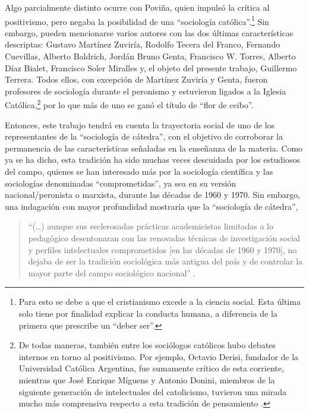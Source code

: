 Algo parcialmente distinto ocurre con Poviña, quien impulsó la crítica al positivismo, pero negaba la posibilidad de una \enquote{sociología católica}.\footnote{Para \textcite{1532-POVINA1955} esto se debe a que el cristianismo excede a la ciencia social. Esta última solo tiene por finalidad explicar la conducta humana, a diferencia de la primera que prescribe un \enquote{deber ser}.} Sin embargo, pueden mencionarse varios autores con las dos últimas características descriptas: Gustavo Martínez Zuviría, Rodolfo Tecera del Franco, Fernando Cuevillas, Alberto Baldrich, Jordán Bruno Genta, Francisco W. Torres, Alberto Díaz Bialet, Francisco Soler Miralles y, el objeto del presente trabajo, Guillermo Terrera. Todos ellos, con excepción de Martínez Zuviría y Genta, fueron profesores de sociología durante el peronismo y estuvieron ligados a la Iglesia Católica,\footnote{De todas maneras, también entre los sociólogos católicos hubo debates internos en torno al positivismo. Por ejemplo, Octavio Derisi, fundador de la Universidad Católica Argentina, fue sumamente crítico de esta corriente, mientras que José Enrique Míguens y Antonio Donini, miembros de la siguiente generación de intelectuales del catolicismo, tuvieron una mirada mucho más comprensiva respecto a esta tradición de pensamiento \parencite{281-ZANCA2006}.} por lo que más de uno se ganó el título de \enquote{flor de ceibo}.

Entonces, este trabajo tendrá en cuenta la trayectoria social de uno de los representantes de la \enquote{sociología de cátedra}, con el objetivo de corroborar la permanencia de las características señaladas en la enseñanza de la materia. Como ya se ha dicho, esta tradición ha sido muchas veces descuidada por los estudiosos del campo, quienes se han interesado más por la sociología científica y las sociologías denominadas \enquote{comprometidas}, ya sea en su versión nacional/peronista o marxista, durante las décadas de 1960 y 1970. Sin embargo, una indagación con mayor profundidad mostraría que la \enquote{sociología de cátedra},

\begin{quote}
\enquote{(\dots) aunque sus esclerosadas prácticas academicistas limitadas a lo pedagógico desentonaran con las renovadas técnicas de investigación social y perfiles intelectuales comprometidos [en las décadas de 1960 y 1970], no dejaba de ser la tradición sociológica más antigua del país y de controlar la mayor parte del campo sociológico nacional} \parencite[2-3]{1615-DIAZ2013}.
\end{quote}

